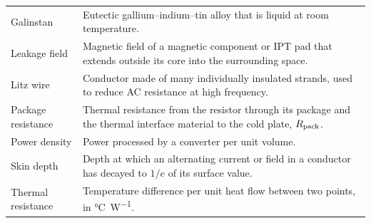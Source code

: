 \begin{longtable}[l]{>{\raggedright}p{}>{\raggedright\arraybackslash}p{}}
\addlinespace
Galinstan & Eutectic gallium--indium--tin alloy that is liquid at room temperature. \\
\addlinespace
Leakage field & Magnetic field of a magnetic component or IPT pad that extends outside its core into the surrounding space. \\
\addlinespace
Litz wire & Conductor made of many individually insulated strands, used to reduce AC resistance at high frequency. \\
\addlinespace
Package resistance & Thermal resistance from the resistor through its package and the thermal interface material to the cold plate, $R_{\mathrm{pack}}$. \\
\addlinespace
Power density & Power processed by a converter per unit volume. \\
\addlinespace
Skin depth & Depth at which an alternating current or field in a conductor has decayed to $1/e$ of its surface value. \\
\addlinespace
Thermal resistance & Temperature difference per unit heat flow between two points, in \si{\celsius\per\watt}. \\
\end{longtable}
\addtocounter{table}{-1}
